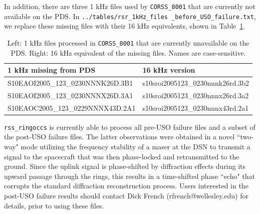 \documentclass[titlepage, 12pt]{article}
\begin{document}
            In addition, there are three 1 kHz files used by
            \texttt{CORSS\_8001} that are currently not available on
            the PDS.
            In \texttt{../tables/rsr\_1kHz\_files%
                       \_before\_USO\_failure.txt},
            we replace these missing files with their 16 kHz equivalents,
            shown in Table~\ref{tab:missing files from PDS}.
            \begin{table}[H]
                \centering
                \begin{tabular}{l l}
                    \hline
                    1 kHz missing from PDS & 16 kHz version\\
                    \hline
                    S10EAOI2005\_123\_0230NNNK26D.3B1&
                    s10sroi2005123\_0230nnnk26rd.3b2\\
                    S10EAOI2005\_123\_0230NNNX26D.3A1&
                    s10sroi2005123\_0230nnnx26rd.3a2\\
                    S10EAOC2005\_123\_0229NNNX43D.2A1&
                    s10sroi2005123\_0230nnnx43rd.2a1\\
                    \hline
                \end{tabular}
                \caption[1 kHz files missing from PDS]
                    {Left: 1 kHz files processed in \texttt{CORSS\_8001}
                     that are currently unavailable on the PDS.
                     Right: 16 kHz equivalent of the missing files.
                     Names are case-sensitive.}
                \label{tab:missing files from PDS}
            \end{table}
            \texttt{rss\_ringoccs} is currently able to process all pre-USO failure files and a subset of the post-USO failure files. The latter 
            observations were obtained in a novel ``two-way" mode utilizing the frequency
            stability of a maser at the DSN to transmit a signal to the spacecraft that was then 
            phase-locked and retransmitted to the ground. Since the uplink signal is phase-shifted by diffraction effects during its upward passage through the rings, this results in a time-shifted phase ``echo" that corrupts the standard diffraction reconstruction process. Users interested in the post-USO failure results should contact Dick French (rfrench@wellesley.edu) for details, prior to using these files.
\end{document}
